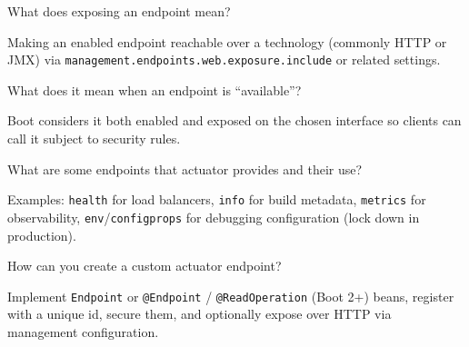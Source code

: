 \question[4]
What does exposing an endpoint mean?
\makeemptybox{1.05in}
\begin{solution}
  Making an enabled endpoint reachable over a technology (commonly HTTP or JMX) via \texttt{management.endpoints.web.exposure.include} or related settings.
\end{solution}

\question[4]
What does it mean when an endpoint is ``available''?
\makeemptybox{1.1in}
\begin{solution}
  Boot considers it both enabled and exposed on the chosen interface so clients can call it subject to security rules.
\end{solution}

\question[4]
What are some endpoints that actuator provides and their use?
\makeemptybox{1.45in}
\begin{solution}
  Examples: \texttt{health} for load balancers, \texttt{info} for build metadata, \texttt{metrics} for observability, \texttt{env}/\texttt{configprops} for debugging configuration (lock down in production).
\end{solution}

\question[4]
How can you create a custom actuator endpoint?
\makeemptybox{1.25in}
\begin{solution}
  Implement \texttt{Endpoint} or \texttt{@Endpoint} / \texttt{@ReadOperation} (Boot 2+) beans, register with a unique id, secure them, and optionally expose over HTTP via management configuration.
\end{solution}


